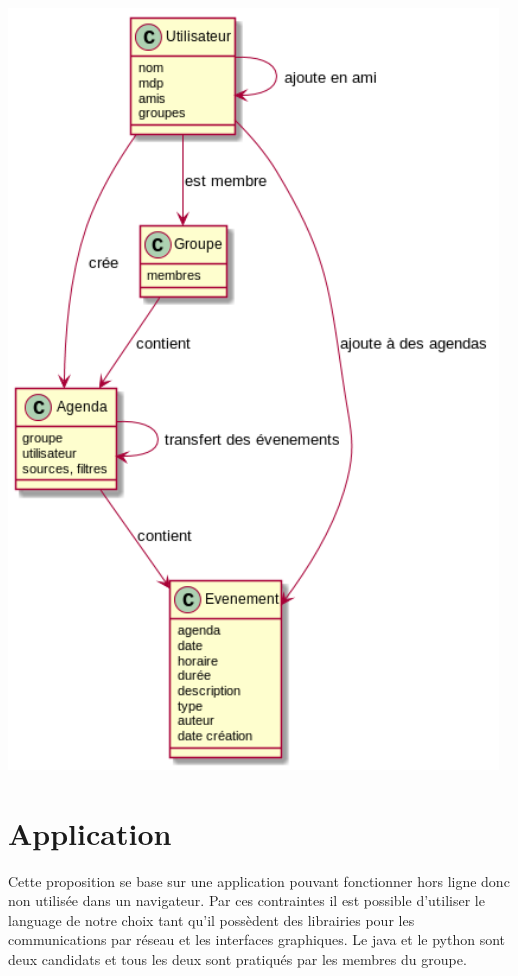 \documentclass[a4paper,12pt]{article}
\begin{document}
\begin{center}
	\includegraphics[width=13cm]{diagramme.png}
\end{center}

\section{Application}

Cette proposition se base sur une application pouvant fonctionner hors ligne donc non utilisée dans un navigateur. Par ces contraintes il est possible d'utiliser le language de notre choix tant qu'il possèdent des librairies pour les communications par réseau et les interfaces graphiques.
Le java et le python sont deux candidats et tous les deux sont pratiqués par les membres du groupe.
\end{document}

